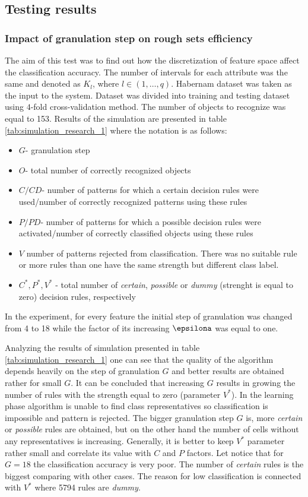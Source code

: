 \subsection{Testing results}
\label{cha:Simulation_results}
\subsubsection{Impact of granulation step on rough sets efficiency}
\label{cha:Simulation_reaearch_1}
The aim of this test was to find out how the discretization of feature space
affect the classification accuracy. The number of intervals for each
attribute was the same and denoted as $K_l$, where $l \in (1, \ldots, q)$.
Habernam dataset was taken as the input to the system. Dataset was divided into
training and testing dataset using $4$-fold cross-validation method. The number
of objects to recognize was equal to 153.
Results of the simulation are presented in table
\ref{tab:simulation_research_1} where the notation is as follows:
\begin{itemize}
    \item $G$- granulation step
    \item $O$- total number of correctly recognized objects
    \item $C/CD$- number of patterns for which a certain decision rules were
        used/number of correctly recognized patterns using these rules 
    \item $P/PD$- number of patterns for which a possible decision rules were
        activated/number of correctly classified objects using these rules
    \item $V$ number of patterns rejected from classification. There was no
        suitable rule or more rules than one have the same strength but different class
        label.
    \item $C^*, P^*, V^*$ - total number of \textit{certain}, \textit{possible}
        or \textit{dummy} (strenght is equal to zero) decision rules, respectively
\end{itemize}
In the experiment, for every feature the initial step of granulation was
changed from 4 to 18 while the factor of its increasing $\epsilona$  was equal 
to one.

Analyzing the results of simulation presented in table \ref{tab:simulation_research_1}
one can see that the quality of the algorithm depends heavily on the step of
granulation $G$ and better results are obtained rather for small $G$.
It can be concluded that increasing $G$ results in growing the number of rules
with the strength equal to zero (parameter $V^*$). In the learning phase
algorithm is unable to find class representatives so classification is 
impossible and pattern is rejected. The bigger granulation step $G$ is, more
\textit{certain} or \textit{possible} rules are obtained, but on the other hand
the number of cells without any representatives is increasing. Generally, it is
better to keep $V^*$ parameter rather small and correlate its value with $C$
and $P$ factors. Let notice that for $G=18$ the classification accuracy is very
poor. The number of \textit{certain} rules is the biggest comparing with other
cases. The reason for low classification is connected with $V^*$ where 5794
rules are \textit{dummy}.

